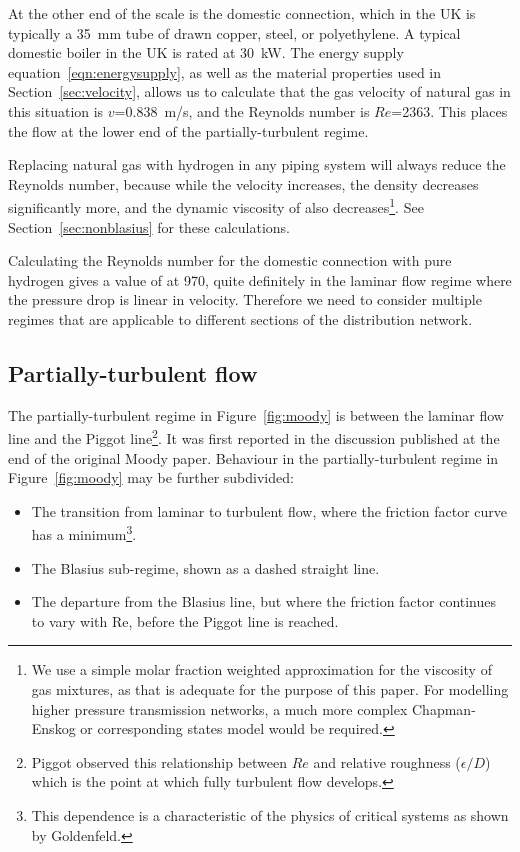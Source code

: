 \documentclass[5p]{elsarticle} %
\begin{document}
At the other end of the scale is the domestic connection, which in the UK is typically a 35~mm tube of drawn copper, steel, or polyethylene\citep{dodds2013}.
A typical domestic boiler in the UK is rated at 30~kW\citep{GASTEC2009, Bennett2020}.
The energy supply equation~\eqref{eqn:energysupply}, as well as the material properties used in Section~\ref{sec:velocity}, allows us to calculate that the gas velocity of natural gas in this situation is $v$=0.838~m/s, and the Reynolds number is $Re$=2363.
This places the flow at the lower end of the partially-turbulent regime.

Replacing natural gas with hydrogen in any piping system will always reduce the Reynolds number, because while the velocity increases, the density decreases significantly more, and the dynamic viscosity of also decreases\footnote{We use a simple molar fraction weighted approximation for the viscosity of gas mixtures, as that is adequate for the purpose of this paper. For modelling higher pressure transmission networks, a much more complex Chapman-Enskog or corresponding states\citep{coolprop} model would be required.}.
See Section~\ref{sec:nonblasius} for these calculations.

Calculating the Reynolds number for the domestic connection with pure hydrogen gives a value of at 970, quite definitely in the laminar flow regime where the pressure drop is linear in velocity.
Therefore we need to consider multiple regimes that are applicable to different sections of the distribution network.

\subsection{Partially-turbulent flow}

The partially-turbulent regime in Figure~\ref{fig:moody} is between the laminar flow line and the 
Piggot line\footnote{Piggot observed this relationship between $Re$ and relative roughness ($\epsilon/D$) which is the point at which fully turbulent flow develops.}.
It was first reported in the discussion published at the end of the original Moody paper\citep{Moody1944}. 
Behaviour in the partially-turbulent regime in Figure~\ref{fig:moody} may be further subdivided:
\begin{itemize}
    \item The transition from laminar to turbulent flow, where the friction factor curve has a minimum\footnote{This dependence is a characteristic of the physics of critical systems as shown by Goldenfeld\citep{Goldenfeld2006}.}.
    \item The Blasius sub-regime, shown as a dashed straight line.
    \item The departure from the Blasius line, but where the friction factor continues to vary with Re, before the Piggot line is reached.
\end{itemize}
\end{document}
